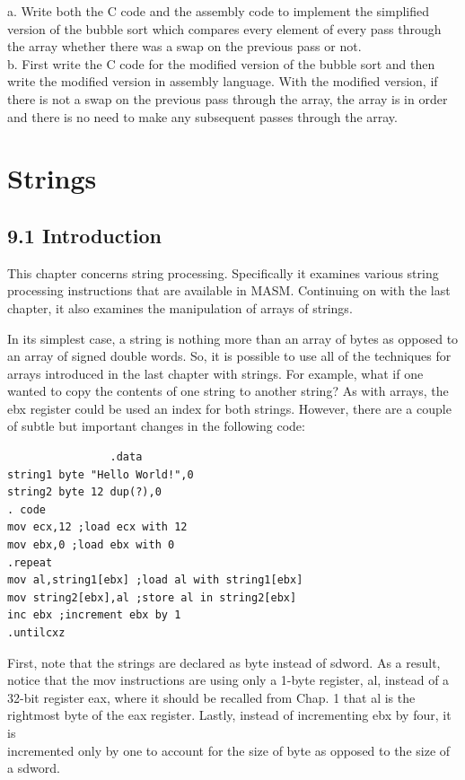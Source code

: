 \documentclass[10pt]{book}
\begin{document}
a. Write both the C code and the assembly code to implement the simplified version of the bubble sort which compares every element of every pass through the array whether there was a swap on the previous pass or not.\\
b. First write the C code for the modified version of the bubble sort and then write the modified version in assembly language. With the modified version, if there is not a swap on the previous pass through the array, the array is in order and there is no need to make any subsequent passes through the array.

\section*{Strings}
\subsection*{9.1 Introduction}
This chapter concerns string processing. Specifically it examines various string processing instructions that are available in MASM. Continuing on with the last chapter, it also examines the manipulation of arrays of strings.

In its simplest case, a string is nothing more than an array of bytes as opposed to an array of signed double words. So, it is possible to use all of the techniques for arrays introduced in the last chapter with strings. For example, what if one wanted to copy the contents of one string to another string? As with arrays, the ebx register could be used an index for both strings. However, there are a couple of subtle but important changes in the following code:

\begin{verbatim}
                .data
string1 byte "Hello World!",0
string2 byte 12 dup(?),0
. code
mov ecx,12 ;load ecx with 12
mov ebx,0 ;load ebx with 0
.repeat
mov al,string1[ebx] ;load al with string1[ebx]
mov string2[ebx],al ;store al in string2[ebx]
inc ebx ;increment ebx by 1
.untilcxz
\end{verbatim}

First, note that the strings are declared as byte instead of sdword. As a result, notice that the mov instructions are using only a 1-byte register, al, instead of a 32-bit register eax, where it should be recalled from Chap. 1 that al is the rightmost byte of the eax register. Lastly, instead of incrementing ebx by four, it is\\
incremented only by one to account for the size of byte as opposed to the size of a sdword.
\end{document}
